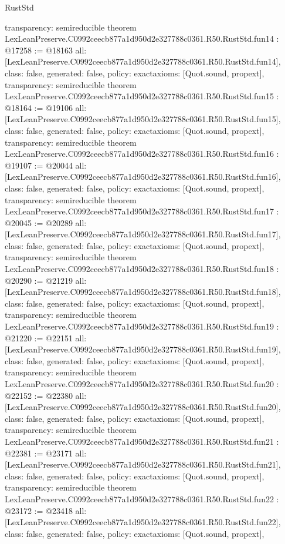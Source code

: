 \begin{lexlean}{RustStd}
\begin{coremodule}
{  transparency: semireducible
}
theorem LexLeanPreserve.C0992ceecb877a1d950d2e327788c0361.R50.RustStd.fun14 : @17258 := @18163 {
  all: [LexLeanPreserve.C0992ceecb877a1d950d2e327788c0361.R50.RustStd.fun14],
  class: false,
  generated: false,
  policy: exact{axioms: [Quot.sound, propext]},
  transparency: semireducible
}
theorem LexLeanPreserve.C0992ceecb877a1d950d2e327788c0361.R50.RustStd.fun15 : @18164 := @19106 {
  all: [LexLeanPreserve.C0992ceecb877a1d950d2e327788c0361.R50.RustStd.fun15],
  class: false,
  generated: false,
  policy: exact{axioms: [Quot.sound, propext]},
  transparency: semireducible
}
theorem LexLeanPreserve.C0992ceecb877a1d950d2e327788c0361.R50.RustStd.fun16 : @19107 := @20044 {
  all: [LexLeanPreserve.C0992ceecb877a1d950d2e327788c0361.R50.RustStd.fun16],
  class: false,
  generated: false,
  policy: exact{axioms: [Quot.sound, propext]},
  transparency: semireducible
}
theorem LexLeanPreserve.C0992ceecb877a1d950d2e327788c0361.R50.RustStd.fun17 : @20045 := @20289 {
  all: [LexLeanPreserve.C0992ceecb877a1d950d2e327788c0361.R50.RustStd.fun17],
  class: false,
  generated: false,
  policy: exact{axioms: [Quot.sound, propext]},
  transparency: semireducible
}
theorem LexLeanPreserve.C0992ceecb877a1d950d2e327788c0361.R50.RustStd.fun18 : @20290 := @21219 {
  all: [LexLeanPreserve.C0992ceecb877a1d950d2e327788c0361.R50.RustStd.fun18],
  class: false,
  generated: false,
  policy: exact{axioms: [Quot.sound, propext]},
  transparency: semireducible
}
theorem LexLeanPreserve.C0992ceecb877a1d950d2e327788c0361.R50.RustStd.fun19 : @21220 := @22151 {
  all: [LexLeanPreserve.C0992ceecb877a1d950d2e327788c0361.R50.RustStd.fun19],
  class: false,
  generated: false,
  policy: exact{axioms: [Quot.sound, propext]},
  transparency: semireducible
}
theorem LexLeanPreserve.C0992ceecb877a1d950d2e327788c0361.R50.RustStd.fun20 : @22152 := @22380 {
  all: [LexLeanPreserve.C0992ceecb877a1d950d2e327788c0361.R50.RustStd.fun20],
  class: false,
  generated: false,
  policy: exact{axioms: [Quot.sound, propext]},
  transparency: semireducible
}
theorem LexLeanPreserve.C0992ceecb877a1d950d2e327788c0361.R50.RustStd.fun21 : @22381 := @23171 {
  all: [LexLeanPreserve.C0992ceecb877a1d950d2e327788c0361.R50.RustStd.fun21],
  class: false,
  generated: false,
  policy: exact{axioms: [Quot.sound, propext]},
  transparency: semireducible
}
theorem LexLeanPreserve.C0992ceecb877a1d950d2e327788c0361.R50.RustStd.fun22 : @23172 := @23418 {
  all: [LexLeanPreserve.C0992ceecb877a1d950d2e327788c0361.R50.RustStd.fun22],
  class: false,
  generated: false,
  policy: exact{axioms: [Quot.sound, propext]},
}
\end{coremodule}
\end{lexlean}
